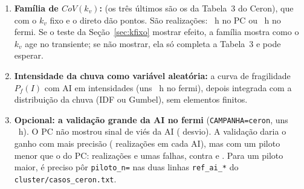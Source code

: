 \documentclass[11pt,a4paper]{article}
\begin{document}
\begin{enumerate}
Carlo direto de \SugNporCaso{} realizações por caso: \SugBCpu~h de CPU e uns \SugBRelogio~h com \Nos{} nós com
\texttt{nref=3} (com \texttt{nref=4}, uns \SugBCpuQuatro~h e \SugBRelogioQuatro~h). Na campanha antiga, \SugDiretos{}
desses casos tiveram $P_f$ de \SugPfMinDireto\% a \SugPfMaxAntiga\%: neles o direto com \SugNporCaso{} realizações dá
$CoV(P_f) \leq \SugCovPfMax\%$. Os outros \SugPequenos, com $P_f < \SugLimiar\%$ (\SugPequenosLista), pedem AI: piloto
e AI com metade das realizações cada, no mesmo custo. Esses casos ainda não existem: as linhas entram no
\texttt{cluster/casos\_ceron.txt} na fase~2, como em ``Mais casos'' do \texttt{README.md}, e a submissão é
\texttt{CAMPANHA=ceron CASOS=fase2 ./submeter.sh \Nos}, para não rodar junto os \texttt{ref\_*} do item~6.
\item \textbf{Família de $CoV(k_v)$:} \SugKLista{} (os três últimos são os da Tabela~3 do Ceron), que
com o $k_v$ fixo e o direto dão \SugKPontos{} pontos. São \SugKN{} realizações: \SugKRelogioPC~h no PC ou
\SugKRelogioFermi~h no fermi. Se o teste da Seção~\ref{sec:kfixo} mostrar efeito, a família mostra como o $k_v$ age
no transiente; se não mostrar, ela só completa a Tabela~3 e pode esperar.
\item \textbf{Intensidade da chuva como variável aleatória:} a curva de fragilidade $P_f(I)$ com AI em \SugFragI{}
intensidades (uns \SugFragRelogio~h no fermi), depois integrada com a distribuição da chuva (IDF ou Gumbel), sem
elementos finitos.
\item \textbf{Opcional: a validação grande da AI no fermi} (\texttt{CAMPANHA=ceron}, uns \CeronRelogio~h). O PC não
mostrou sinal de viés da AI (\DifBanda{} desvio). A validação daria o ganho com mais precisão (\CeronBanda{}
realizações em cada AI), mas com um piloto menor que o do PC: \CeronPiloto{} realizações e umas \CeronPilotoFalhas{}
falhas, contra \NDireto{} e \NfDireto. Para um piloto maior, é preciso pôr \texttt{piloto\_n=\NDireto} nas duas linhas
\texttt{ref\_ai\_*} do \texttt{cluster/casos\_ceron.txt}.
\end{enumerate}
\end{document}
